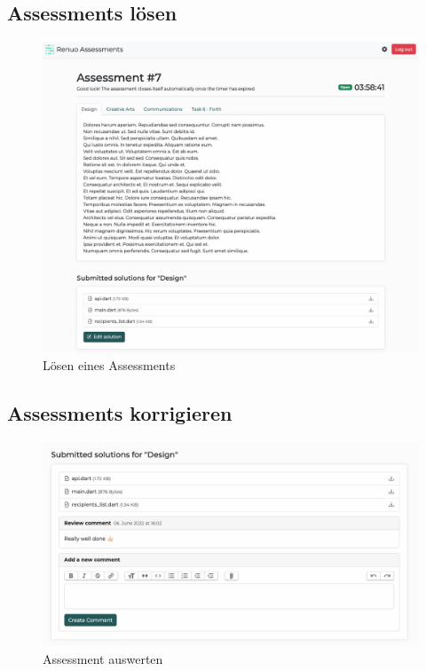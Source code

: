 \subsection{Assessments lösen}

\begin{figure}[H]
  \centering
  \includegraphics[width=14cm]{images/ui/solve-assessment.png}
  \caption{\label{fig:solve-assessment}Lösen eines Assessments}
\end{figure}


\subsection{Assessments korrigieren}

\begin{figure}[H]
  \centering
  \includegraphics[width=14cm]{images/ui/review-comments.png}
  \caption{\label{fig:review-comments}Assessment auswerten}
\end{figure}
